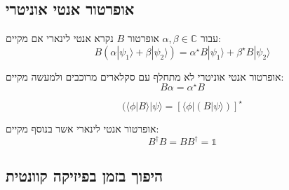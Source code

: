 \documentclass{tstextbook}
\begin{document}
\subsection{אופרטור אנטי אוניטרי}

\begin{definition}
עבור \(\alpha,\beta \in \mathbb{C}\) אופרטור \(B\) נקרא אנטי לינארי אם מקיים:
$$B(\alpha|\psi_{1}\rangle+\beta|\psi_{2}\rangle)=\alpha^{\star}B|\psi_{1}\rangle+\beta^{\star}B|\psi_{2}\rangle$$

\end{definition}
\begin{corollary}
אופרטור אנטי אוניטרי לא מתחלף עם סקלארים מרוכבים ולמעשה מקיים:
$$B\alpha=\alpha^{\star}B$$

\end{corollary}
\begin{definition}
$$(\langle\phi|B\rangle|\psi\rangle=[\langle\phi|(B|\psi\rangle)]^{\star}$$

\end{definition}
\begin{definition}
אופרטור אנטי לינארי אשר בנוסף מקיים:
$$B^{\dagger}B=B B^{\dagger}=\mathbb{1} $$

\end{definition}
\subsection{היפוך בזמן בפיזיקה קוונטית}
\end{document}
